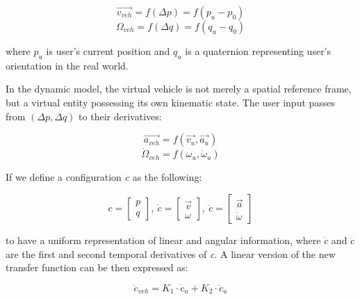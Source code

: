 \begin{equation}
\label{eq:old_tf_t}
\overrightarrow{v_{veh}}=f(\Delta p)=f(p_{u}-p_{0})
\end{equation}
\begin{equation}
\label{eq:old_tf_r}
\Omega_{veh}=f(\Delta q)=f(q_{u}-q_{0})
\end{equation}

where $p_{u}$ is user's current position and $q_{u}$ is a quaternion representing user's orientation in the real world.

In the dynamic model, the virtual vehicle is not merely a spatial reference frame, but a virtual entity possessing its own kinematic state. The user input passes from $(\Delta p, \Delta q)$ to their derivatives: 

\begin{equation}
\overrightarrow{a_{veh}}=f(\overrightarrow{v_{u}}, \overrightarrow{a_{u}})
\end{equation}
\begin{equation}
\dot{\Omega}_{veh}=f(\omega_{u}, \dot{\omega}_{u})
\end{equation}

If we define a configuration \textit{c} as the following:

\begin{equation}
c=
\begin{bmatrix}
p \\ q
\end{bmatrix},\:
\dot{c}=
\begin{bmatrix}
\overrightarrow{v} \\ \omega
\end{bmatrix},\:
\ddot{c}=
\begin{bmatrix}
\overrightarrow{a} \\ \dot{\omega}
\end{bmatrix}
\end{equation}

to have a uniform representation of linear and angular information, where $\dot{c}$ and $\ddot{c}$ are the first and second temporal derivatives of \textit{c}. A linear version of the new transfer function can be then expressed as:

\begin{equation}
\ddot{c}_{veh}=K_{1} \cdot \dot{c}_{u} + K_{2} \cdot \ddot{c}_{u}
\end{equation}

